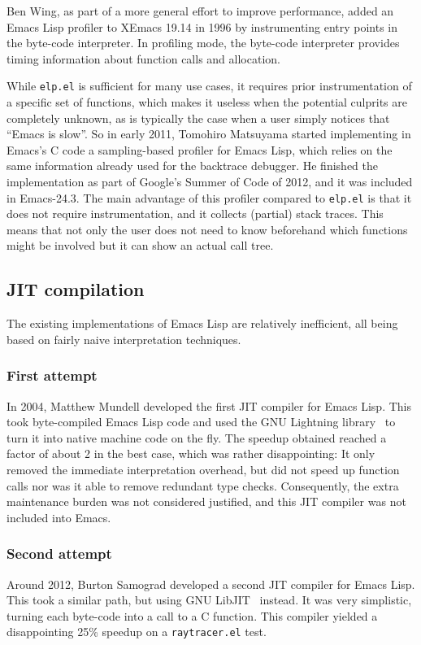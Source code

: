 \documentclass[format=acmsmall, review]{acmart}
\newcommand \Elisp {Emacs Lisp}
\begin{document}
Ben Wing, as part of a more general effort to improve performance, added an \Elisp{} profiler to XEmacs 19.14 in
1996 by instrumenting entry points in the byte-code interpreter.
In profiling mode, the byte-code interpreter provides timing
information about function calls and allocation.

While \texttt{elp.el} is sufficient for many use cases, it requires prior
instrumentation of a specific set of functions, which makes it useless when
the potential culprits are completely unknown, as is typically the case when
a user simply notices that ``Emacs is slow''.
So in early 2011, Tomohiro Matsuyama started implementing in Emacs's C code
a sampling-based profiler for \Elisp{}, which relies on the same information
already used for the backtrace debugger.  He finished the implementation as
part of Google's Summer of Code of 2012, and it was included in Emacs-24.3.
The main advantage of this profiler compared to \texttt{elp.el} is that it
does not require instrumentation, and it collects (partial) stack traces.
This means that not only the user does not need to know beforehand which
functions might be involved but it can show an actual call tree.

\subsection{JIT compilation}
\label{sec:jit}

The existing implementations of \Elisp{} are relatively inefficient, all
being based on fairly naive interpretation techniques.

\subsubsection*{First attempt}
In 2004, Matthew Mundell developed the first JIT compiler for \Elisp.
This took byte-compiled \Elisp{} code and used the GNU Lightning
library~\cite{GNULightning} to turn it into native machine code on the
fly.  The speedup obtained reached a factor of about 2 in the best
case, which was rather disappointing: It only removed the immediate
interpretation overhead, but did not speed up function calls nor was it
able to remove redundant type checks.  Consequently, the extra
maintenance burden was not considered justified, and this JIT compiler
was not included into Emacs.

\subsubsection*{Second attempt}
Around 2012, Burton Samograd developed a second JIT compiler for \Elisp.
This took a similar path, but using GNU LibJIT~\cite{GNULibjit} instead.
It was very simplistic, turning each byte-code into a call to a C function.
This compiler yielded a disappointing 25\% speedup on
a \texttt{raytracer.el} test.
\end{document}
